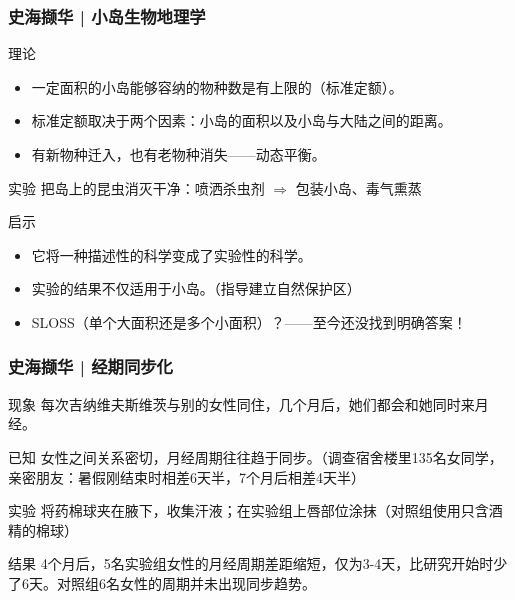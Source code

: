 \begin{frame}
  \frametitle{史海撷华 | 小岛生物地理学}
  \begin{block}{理论}
    \begin{itemize}
      \item 一定面积的小岛能够容纳的物种数是有上限的（标准定额）。
      \item 标准定额取决于两个因素：小岛的面积以及小岛与大陆之间的距离。
      \item 有新物种迁入，也有老物种消失——动态平衡。
    \end{itemize}
  \end{block}
  \pause
  \begin{block}{实验}
    把岛上的昆虫消灭干净：喷洒杀虫剂 $\Longrightarrow$ 包装小岛、毒气熏蒸
  \end{block}
  \pause
  \begin{block}{启示}
    \begin{itemize}
      \item 它将一种描述性的科学变成了实验性的科学。
      \item 实验的结果不仅适用于小岛。（指导建立自然保护区）
      \item SLOSS（单个大面积还是多个小面积）？——至今还没找到明确答案！
    \end{itemize}
  \end{block}
\end{frame}

\begin{frame}
  \frametitle{史海撷华 | 经期同步化}
  \begin{block}{现象}
    每次吉纳维夫\textbullet 斯维茨与别的女性同住，几个月后，她们都会和她同时来月经。
  \end{block}
  \pause
  \begin{block}{已知}
    女性之间关系密切，月经周期往往趋于同步。（调查宿舍楼里135名女同学，亲密朋友：暑假刚结束时相差6天半，7个月后相差4天半）
  \end{block}
  \pause
  \begin{block}{实验}
      将药棉球夹在腋下，收集汗液；在实验组上唇部位涂抹（对照组使用只含酒精的棉球）
  \end{block}
  \pause
  \begin{block}{结果}
      4个月后，5名实验组女性的月经周期差距缩短，仅为3-4天，比研究开始时少了6天。对照组6名女性的周期并未出现同步趋势。
  \end{block}
\end{frame}

